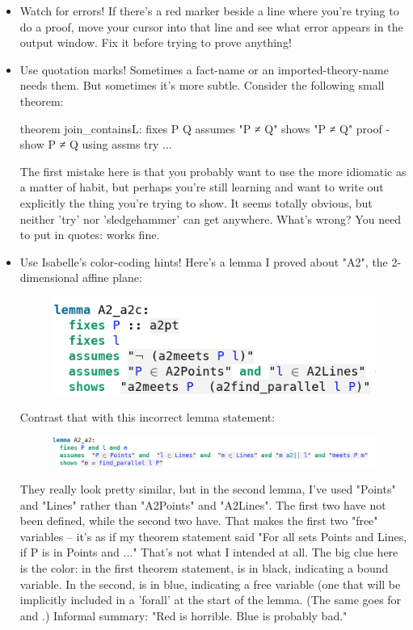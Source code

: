 \begin{itemize}
    \item Watch for errors! If there's a red marker beside a line where you're trying to do a proof, move your cursor into that line and see what error appears in the output window. Fix it before trying to prove anything!

    \item Use quotation marks! Sometimes a fact-name or an imported-theory-name needs them. But sometimes it's more subtle. Consider the following small theorem:
\begin{IS}    
theorem join_containsL:
  fixes P Q
  assumes "P ≠ Q"
  shows "P ≠ Q"
proof -
  show P ≠ Q using assms try 
...
\end{IS}
The first mistake here is that you probably want to use the more idiomatic  as a matter of habit, but perhaps you're still learning and want to write out explicitly the thing you're trying to show. It seems totally obvious, but neither 'try' nor 'sledgehammer' can get anywhere. What's wrong? You need to put  in quotes:
 works fine. 

\item Use Isabelle's color-coding hints! Here's a lemma I proved about "A2", the 2-dimensional affine plane:
\begin{figure}[h]
    \includegraphics[width=0.5\linewidth]{TEXT/C03/Images/good-statement.png}
\end{figure}

Contrast that with this incorrect lemma statement:
\begin{figure}[h]
    \includegraphics[width=\linewidth]{TEXT/C03/Images/bad-statement.png}
\end{figure}
They really look pretty similar, but in the second lemma, I've used "Points" and "Lines" rather than "A2Points" and "A2Lines". The first two have not been defined, while the second two have. That makes the first two "free" variables -- it's as if my theorem statement said "For all sets Points and Lines, if P is in Points and ..."
That's not what I intended at all. The big clue here is the color: in the first theorem statement,  is in black, indicating a bound variable. In the second,  is in blue, indicating a free variable (one that will be implicitly included in a 'forall' at the start of the lemma. (The same goes for  and .) Informal summary: "Red is horrible. Blue is probably bad." 


\end{itemize}
